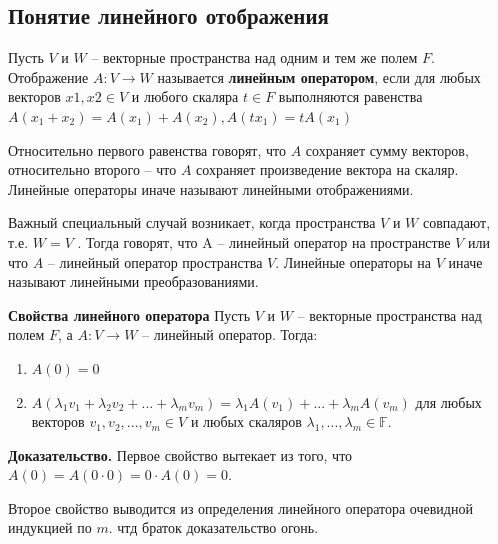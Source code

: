 \documentclass[a4paper]{article}
\begin{document}
    \newpage \begin{center}
                 \begin{Large}
                 \end{Large}
    \end{center}
    \subsection*{Понятие линейного отображения}

    Пусть $V$ и $W$ – векторные пространства над одним и тем же полем $F$.
    Отображение $A: V \rightarrow W$ называется \textbf{линейным оператором}, если
    для любых векторов $x1, x2 \in V$ и любого скаляра $t \in F$ выполняются
    равенства $A(x_1+x_2) = A(x_1) + A(x_2), A(tx_1) = tA(x_1)$

    Относительно первого равенства говорят, что $A$ сохраняет сумму векторов,
    относительно второго – что $A$ сохраняет произведение вектора на скаляр.
    Линейные операторы иначе называют линейными отображениями.

    Важный специальный случай возникает, когда пространства $V$ и $W$
    совпадают, т.е. $W = V$ . Тогда говорят, что A – линейный оператор
    на пространстве $V$ или что $A$ – линейный оператор пространства $V$.
    Линейные операторы на $V$ иначе называют линейными преобразованиями.

    \begin{htheorem}
        \textbf{Свойства линейного оператора}
        Пусть $V$ и $W$ – векторные пространства над полем $F$, а $A: V \rightarrow W$ –
        линейный оператор. Тогда:
        \begin{enumerate}
            \item $A(0) = 0$
            \item $A(\lambda_1v_1 + \lambda_2v_2 + ... + \lambda_mv_m) = \lambda_1A(v_1)+...+\lambda_m A(v_m)$ для любых векторов $v_1,v_2, ..., v_m \in V$ и любых скаляров $\lambda_1, ..., \lambda_m \in \mathbb{F}$.
        \end{enumerate}
    \end{htheorem}

    \begin{hproof}
        \textbf{Доказательство.} Первое свойство вытекает из того, что $A(0) = A(0 \cdot 0) = 0 \cdot A(0) = 0$.

        Второе свойство выводится из определения линейного оператора очевидной индукцией по $m$. чтд браток доказательство огонь.
    \end{hproof}
\end{document}
